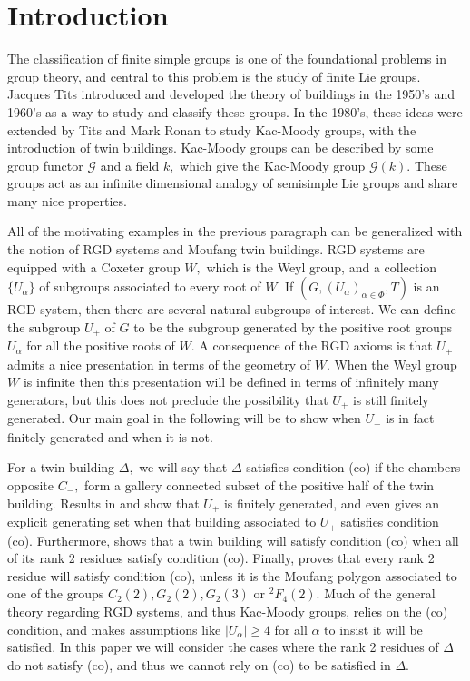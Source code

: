 \documentclass[class=book, crop=false,12 pt]{standalone}
\begin{document}
\chapter{Introduction}
\label{ch:intro}
The classification of finite simple groups is one of the foundational problems in group theory, and central to this problem is the study of finite Lie groups. Jacques Tits introduced and developed the theory of buildings in the 1950's and 1960's as a way to study and classify these groups. In the 1980's, these ideas were extended by Tits and Mark Ronan to study Kac-Moody groups, with the introduction of twin buildings. Kac-Moody groups can be described by some group functor $\mathcal{G}$ and a field $k,$ which give the Kac-Moody group $\mathcal{G}(k).$ These groups act as an infinite dimensional analogy of semisimple Lie groups and share many nice properties. 

All of the motivating examples in the previous paragraph can be generalized with the notion of RGD systems and Moufang twin buildings. RGD systems are equipped with a Coxeter group $W,$ which is the Weyl group, and a collection $\{U_\alpha\}$ of subgroups associated to every root of $W.$ If $(G,(U_\alpha)_{\alpha\in \Phi},T)$ is an RGD system, then there are several natural subgroups of interest. We can define the subgroup $U_+$ of $G$ to be the subgroup generated by the positive root groups $U_\alpha$ for all the positive roots of $W.$ A consequence of the RGD axioms is that $U_+$ admits a nice presentation in terms of the geometry of $W.$ When the Weyl group $W$ is infinite then this presentation will be defined in terms of infinitely many generators, but this does not preclude the possibility that $U_+$ is still finitely generated. Our main goal in the following will be to show when $U_+$ is in fact finitely generated and when it is not.

For a twin building $\Delta,$ we will say that $\Delta$ satisfies condition (co) if the chambers opposite $C_-,$ form a gallery connected subset of the positive half of the twin building. Results in \cite{cop} and \cite{jtco} show that $U_+$ is finitely generated, and even gives an explicit generating set when that building associated to $U_+$ satisfies condition (co). Furthermore, \cite{globalco} shows that a twin building will satisfy condition (co) when all of its rank 2 residues satisfy condition (co). Finally, \cite{cop} proves that every rank 2 residue will satisfy condition (co), unless it is the Moufang polygon associated to one of the groups $C_2(2),G_2(2),G_2(3)$ or ${}^2F_4(2).$ Much of the general theory regarding RGD systems, and thus Kac-Moody groups, relies on the (co) condition, and makes assumptions like $|U_\alpha|\ge 4$ for all $\alpha$ to insist it will be satisfied. In this paper we will consider the cases where the rank 2 residues of $\Delta$ do not satisfy (co), and thus we cannot rely on (co) to be satisfied in $\Delta.$ 
\end{document}
